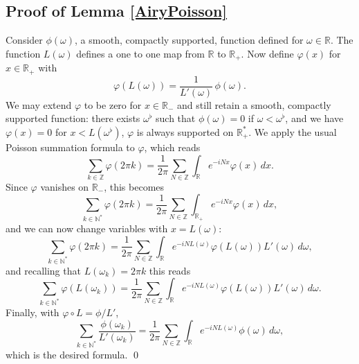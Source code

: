 \documentclass[JEP,XML,SOM,Unicode,NoEqCountersInSection,NoFloatCountersInSection,published]{cedram}
\newcommand\N{{\mathbb N}}
\newcommand\R{{\mathbb R}}
\newcommand\Z{{\mathbb Z}}
\theoremstyle{plain}
\theoremstyle{definition}
\begin{document}
\subsection{Proof of Lemma \ref{AiryPoisson}}
Consider $\phi(\omega)$, a smooth, compactly supported, function defined for $\omega \in \R$. The function $L(\omega)$ defines a one to one map from $\R$ to $\R_{+}$. Now define $\varphi(x)$ for $x\in \R_{+}$ with\vspace*{-3pt}
\[
\varphi(L(\omega))=\frac 1 {L'(\omega)}\, \phi (\omega).
\]
We may extend $\varphi$ to be zero for $x\in \R_{-}$ and still retain a smooth, compactly supported function: there exists $\omega^{\flat}$ such that $\phi(\omega)=0$ if $\omega<\omega^{\flat}$, and we have $\varphi(x)=0$ for $x<L(\omega^{\flat})$, \eg $\varphi$ is always supported on $\R_{+}^{*}$. We apply the usual Poisson summation formula to $\varphi$, which reads\vspace*{-3pt}
\[
\sum_{k\in \Z} \varphi(2\pi k)=\frac 1 {2\pi} \sum_{N\in \Z} \int_{\R} e^{-i N x}\varphi(x)\,dx.
\]
Since $\varphi$ vanishes on $\R_{-}$, this becomes\vspace*{-3pt}
\[
\sum_{k\in \N^{*}} \varphi(2\pi k)=\frac 1 {2\pi} \sum_{N\in \Z} \int_{\R_{+}} e^{-i N x}\varphi(x)\,dx,
\]
and we can now change variables with $x=L(\omega)$:\vspace*{-3pt}
\[
\sum_{k\in \N^{*}} \varphi(2\pi k)=\frac 1 {2\pi} \sum_{N\in \Z} \int_{\R} e^{-i N L(\omega)}\varphi(L(\omega))L'(\omega)\,d\omega,
\]
and recalling that $L(\omega_{k})=2\pi k$ this reads\vspace*{-3pt}
\[
\sum_{k\in \N^{*}} \varphi(L(\omega_{k}))=\frac 1 {2\pi} \sum_{N\in \Z} \int_{\R} e^{-i N L(\omega)}\varphi(L(\omega))L'(\omega)\,d\omega.
\]
Finally, with $\varphi\circ L=\phi/L'$,\vspace*{-3pt}\enlargethispage{\baselineskip}%
\[
\sum_{k\in \N^{*}} \frac {\phi(\omega_{k})}{L'(\omega_{k})}=\frac 1 {2\pi} \sum_{N\in \Z} \int_{\R} e^{-i N L(\omega)}\phi(\omega)\,d\omega,
\]
which is the desired formula. \qed

\backmatter


\end{document}
